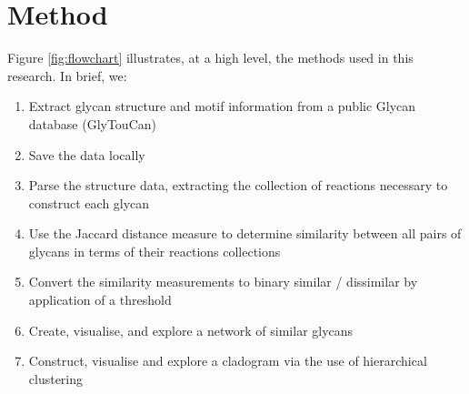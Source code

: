 \documentclass[12pt,a4paper]{article}
\begin{document}


\newpage
\section{Method}
\label{sec:method}

Figure \ref{fig:flowchart} illustrates, at a high level, the methods used in this research. In brief, we:

\begin{enumerate}
\item Extract glycan structure and motif information from a public Glycan database (GlyTouCan)
\item Save the data locally
\item Parse the structure data, extracting the collection of reactions necessary to construct each glycan
\item Use the Jaccard distance measure to determine similarity between all pairs of glycans in terms of their reactions collections
\item Convert the similarity measurements to binary similar / dissimilar by application of a threshold
\item Create, visualise, and explore a network of similar glycans 
\item Construct, visualise and explore a cladogram via the use of hierarchical clustering
\end{enumerate}
\end{document}
